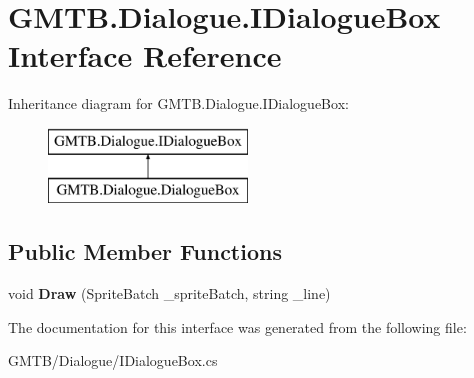 \hypertarget{interface_g_m_t_b_1_1_dialogue_1_1_i_dialogue_box}{}\section{G\+M\+T\+B.\+Dialogue.\+I\+Dialogue\+Box Interface Reference}
\label{interface_g_m_t_b_1_1_dialogue_1_1_i_dialogue_box}
Inheritance diagram for G\+M\+T\+B.\+Dialogue.\+I\+Dialogue\+Box\+:\begin{figure}[H]
\begin{center}
\leavevmode
\includegraphics[height=2.000000cm]{interface_g_m_t_b_1_1_dialogue_1_1_i_dialogue_box}
\end{center}
\end{figure}
\subsection*{Public Member Functions}
\begin{DoxyCompactItemize}
\item 
\mbox{\label{interface_g_m_t_b_1_1_dialogue_1_1_i_dialogue_box_a1974f97f06e7e21990a9a1d291b3a46f}} 
void {\bfseries Draw} (Sprite\+Batch \+\_\+sprite\+Batch, string \+\_\+line)
\end{DoxyCompactItemize}


The documentation for this interface was generated from the following file\+:\begin{DoxyCompactItemize}
\item 
G\+M\+T\+B/\+Dialogue/I\+Dialogue\+Box.\+cs\end{DoxyCompactItemize}
